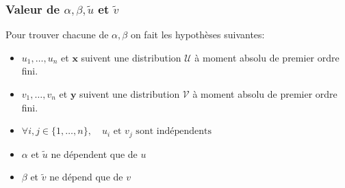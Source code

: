 \subsubsection{Valeur de $\alpha,\beta,\tilde{u}$ et $\tilde{v}$} 
Pour trouver chacune de $\alpha,\beta$ on fait les hypothèses suivantes:
\begin{itemize}
	\item $u_1,\dots,u_n$ et $\boldsymbol{x}$ suivent une distribution $\mathcal{U}$ à moment absolu de premier ordre fini. 
	\item $v_1,\dots,v_n$ et $\boldsymbol{y}$ suivent une distribution $\mathcal{V}$ à moment absolu de premier ordre fini.
	\item $\forall i,j\in\{1,\dots,n\},\quad u_i \text{ et } v_j \text{ sont indépendents}$ 
	\item $\alpha$ et $\tilde{u}$ ne dépendent que de $u$
	\item $\beta$ et $\tilde{v}$ ne dépend que de $v$
\end{itemize}

